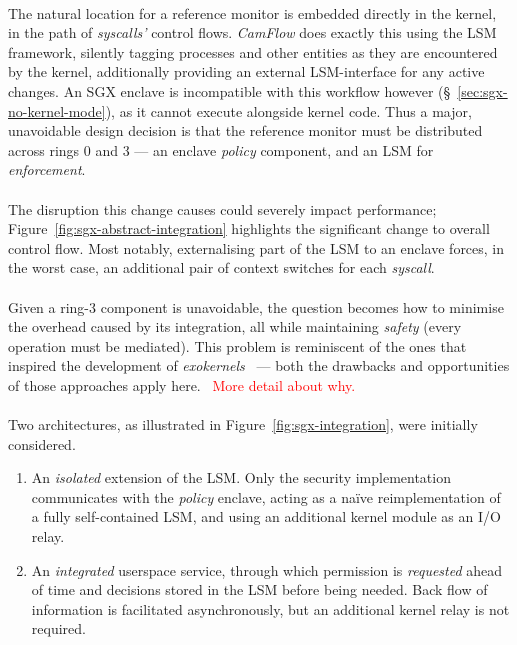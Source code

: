 \paragraph{} The natural location for a reference monitor is embedded directly in the kernel, in the path of \textit{syscalls'} control flows. \textit{CamFlow} does exactly this using the LSM framework, silently tagging processes and other entities as they are encountered by the kernel, additionally providing an external LSM-interface for any active changes. An SGX enclave is incompatible with this workflow however (§~\ref{sec:sgx-no-kernel-mode}), as it cannot execute alongside kernel code. Thus a major, unavoidable design decision is that the reference monitor must be distributed across rings 0 and 3 --- an enclave \textit{policy} component, and an LSM for \textit{enforcement}.

\paragraph{} The disruption this change causes could severely impact performance; Figure~\ref{fig:sgx-abstract-integration} highlights the significant change to overall control flow. Most notably, externalising part of the LSM to an enclave forces, in the worst case, an additional pair of context switches for each \textit{syscall}.

\paragraph{} Given a ring-3 component is unavoidable, the question becomes how to minimise the overhead caused by its integration, all while maintaining \textit{safety} (every operation must be mediated). This problem is reminiscent of the ones that inspired the development of \textit{exokernels}~\cite{10.1145/224056.224076} --- both the drawbacks and opportunities of those approaches apply here.~\cite{10.1145/269005.266644} \textcolor{red}{More detail about why.}

\paragraph{} Two architectures, as illustrated in Figure~\ref{fig:sgx-integration}, were initially considered. 

\begin{enumerate}
    \item An \textit{isolated} extension of the LSM. Only the security implementation communicates with the \textit{policy} enclave, acting as a na\"{i}ve reimplementation of a fully self-contained LSM, and using an additional kernel module as an I/O relay.
    \item An \textit{integrated} userspace service, through which permission is \textit{requested} ahead of time and decisions stored in the LSM before being needed. Back flow of information is facilitated asynchronously, but an additional kernel relay is not required.
\end{enumerate}



